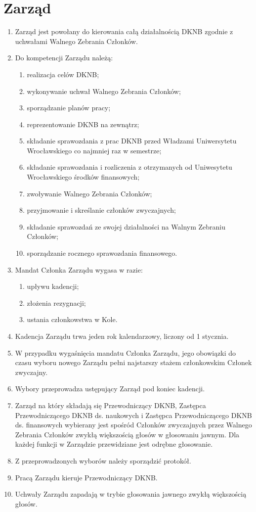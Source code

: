 \documentclass{article}
\begin{document}
\section{Zarząd}
  \begin{enumerate}
    \item Zarząd jest powołany do kierowania całą działalnością DKNB zgodnie z uchwałami Walnego Zebrania Członków.
    \item Do kompetencji Zarządu należą:
      \begin{enumerate}
        \item realizacja celów DKNB;
        \item wykonywanie uchwał Walnego Zebrania Członków;
        \item sporządzanie planów pracy;
        \item reprezentowanie DKNB na zewnątrz;
        \item składanie sprawozdania z prac DKNB przed Władzami Uniwersytetu Wrocławskiego co najmniej raz w semestrze;
        \item składanie sprawozdania i rozliczenia z otrzymanych od Uniwesytetu Wrocławskiego środków finansowych;
        \item zwoływanie Walnego Zebrania Członków;
        \item przyjmowanie i skreślanie członków zwyczajnych;
        \item składanie sprawozdań ze swojej działalności na Walnym Zebraniu Członków;
        \item sporządzanie rocznego sprawozdania finansowego.
      \end{enumerate}
    \item Mandat Członka Zarządu wygasa w razie:
	\begin{enumerate}
	 \item upływu kadencji;
	 \item złożenia rezygnacji;
	 \item ustania członkowstwa w Kole.
	\end{enumerate}
  \item Kadencja Zarządu trwa jeden rok kalendarzowy, liczony od 1 stycznia.
     \item W przypadku wygaśnięcia mandatu Członka Zarządu, jego obowiązki do czasu wyboru nowego Zarządu pełni najstarszy stażem członkowskim Członek zwyczajny.
    \item Wybory przeprowadza ustępujący Zarząd pod koniec kadencji.
    \item Zarząd na który składają się Przewodniczący DKNB, Zastępca Przewodniczącego DKNB ds. naukowych i Zastępca Przewodniczącego DKNB ds. finansowych wybierany jest spośród Członków zwyczajnych przez Walnego Zebrania Członków zwykłą większością głosów w głosowaniu jawnym. Dla każdej funkcji w Zarządzie przewidziane jest odrębne głosowanie.
   \item Z przeprowadzonych wyborów należy sporządzić protokół.
   \item Pracą Zarządu kieruje Przewodniczący DKNB. 
   \item Uchwały Zarządu zapadają w trybie głosowania jawnego zwykłą większością głosów.
  \end{enumerate}
\end{document}
